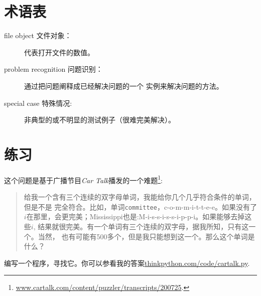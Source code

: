 \section{术语表}

\begin{description}

\item [file object 文件对象：] 代表打开文件的数值。

\item [problem recognition 问题识别：]通过把问题阐释成已经解决问题的一个
实例来解决问题的方法。

\item [special case 特殊情况:]非典型的或不明显的测试例子（很难完美解决）。

\end{description}

\section{练习}

\begin{ex}



这个问题是基于广播节目{\em Car Talk}播发的一个难题\footnote{\url{www.cartalk.com/content/puzzler/transcripts/200725}.}:

\begin{quote}

 给我一个含有三个连续的双字母单词，我能给你几个几乎符合条件的单词，但是不是
 完全符合。比如，单词{\tt committee}，c-o-m-m-i-t-t-e-e。如果没有了$i$在那里，会更完美；Mississippi也是:M-i-s-s-i-s-s-i-p-p-i。如果能够去掉这些$i$,
 结果就很完美。有一个单词有三个连续的双字母，据我所知，只有这一个。当然，
 也有可能有500多个，但是我只能想到这一个。那么这个单词是什么？
 \end{quote}

 编写一个程序，寻找它。你可以参看我的答案\url{thinkpython.com/code/cartalk.py}.

\end{ex}



